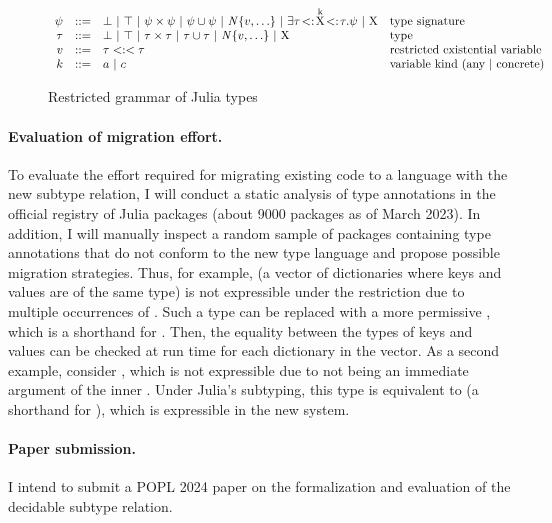 \begin{figure}[t]
\small
\[
\begin{array}{rcll}
  \psi & ::= &
    \bot ~\vert~ \top ~\vert~
    \psi \times \psi ~\vert~ \psi \cup \psi ~\vert~
    \mathit{N}\{v,\ldots\} ~\vert~
    \exists\tau\!<:\!\mathrm{\overset{k}{X}}\!<:\!\tau.\psi ~\vert~ \mathrm{X}
    & \text{type signature} \\
  \tau & ::= & 
    \bot ~\vert~ \top ~\vert~
    \tau \times \tau ~\vert~ \tau \cup \tau ~\vert~
    \mathit{N}\{v,\ldots\} ~\vert~ \mathrm{X}
    & \text{type} \\
  v & ::= &
    \tau<:<\tau
    & \text{restricted existential variable} \\
  k & ::= & a ~\vert~ c & \text{variable kind (any | concrete)}
\end{array}
\]
\caption{Restricted grammar of Julia types}\label{fig:restricted-type-grammar}
\end{figure}

\paragraph*{Evaluation of migration effort.}
To evaluate the effort required for migrating existing code to a language
with the new subtype relation, I will conduct a static analysis of type
annotations in the official registry of Julia packages
(about 9000 packages as of March 2023).
In addition, I will manually inspect a random sample of packages containing
type annotations that do not conform to the new type language
and propose possible migration strategies.
Thus, for example,  (a vector
of dictionaries where keys and values are of the same type) is not expressible
under the restriction due to multiple occurrences of .
Such a type can be replaced with a more permissive
, which is a shorthand for
. Then, the equality between
the types of keys and values can be checked at run time for each dictionary
in the vector.
As a second example, consider ,
which is not expressible due to  not being an immediate argument of
the inner . Under Julia's subtyping, this type is equivalent
to  (a shorthand for
),
which is expressible in the new system.

\paragraph*{Paper submission.}
I intend to submit a POPL 2024 paper on the formalization and evaluation of
the decidable subtype relation.

